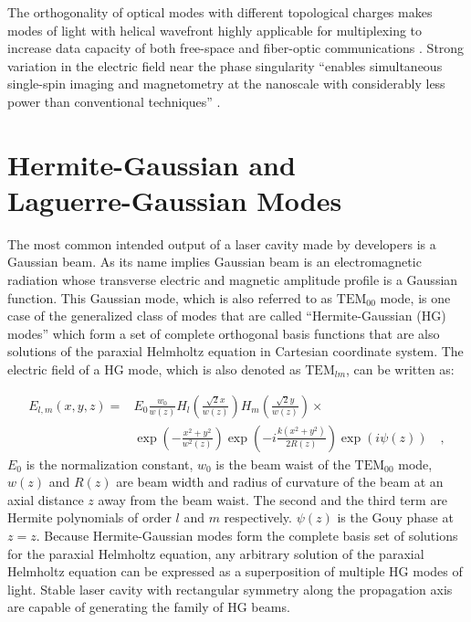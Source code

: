 The orthogonality of optical modes with different topological charges makes modes of light with helical wavefront highly applicable for multiplexing to increase data capacity of both free-space and fiber-optic communications \cite{Gibson:04, Willner_2016, Bozinovic1545, SHAO2018545}. Strong variation in the electric field near the phase singularity ``enables simultaneous single-spin imaging and magnetometry at the nanoscale with considerably less power than conventional techniques'' \cite{maurer2010}.

\section{Hermite-Gaussian and \\ Laguerre-Gaussian Modes}

The most common intended output of a laser cavity made by developers is a Gaussian beam. As its name implies Gaussian beam is an electromagnetic radiation whose transverse electric and magnetic amplitude profile is a Gaussian function. This Gaussian mode, which is also referred to as $\mathrm{TEM}_{00}$ mode, is one case of the generalized class of modes that are called ``Hermite-Gaussian (HG) modes'' which form a set of complete orthogonal basis functions that are also solutions of the paraxial Helmholtz equation in Cartesian coordinate system. The electric field of a HG mode, which is also denoted as $\mathrm{TEM}_{lm}$, can be written as:

\begin{equation}
\label{eq:HG beam}
\begin{split}
E_{l,m}(x,y,z) = & E_0 \frac{w_0}{w(z)} H_{l}\left( \frac{\sqrt{2}x}{w(z)}\right) H_{m}\left(\frac{\sqrt{2}y}{w(z)}\right) \times \\
& \exp \left(-\frac{x^2 + y^2}{w^2 (z)}\right) \exp \left(-i\frac{k(x^2 + y^2)}{2R(z)}\right) \exp (i\psi (z)) \quad ,
\end{split}
\end{equation}
$E_0$ is the normalization constant, $w_0$ is the beam waist of the $\mathrm{TEM}_{00}$ mode, $w(z)$ and $R(z)$ are beam width and radius of curvature of the beam at an axial distance $z$ away from the beam waist. The second and the third term are Hermite polynomials \cite{abramowitz+stegun} of order $l$ and $m$ respectively. $\psi (z)$ is the Gouy phase at $z=z$. Because Hermite-Gaussian modes form the complete basis set of solutions for the paraxial Helmholtz equation, any arbitrary solution of the paraxial Helmholtz equation can be expressed as a superposition of multiple HG modes of light. Stable laser cavity with rectangular symmetry along the propagation axis are capable of generating the family of HG beams.

